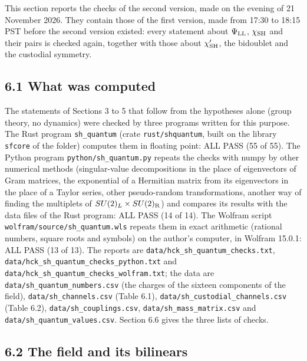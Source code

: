 \documentclass[
  10pt,
]{article}
\begin{document}
This section reports the checks of the second version, made on the
evening of 21 November 2026. They contain those of the first version,
made from 17:30 to 18:15 PST before the second version existed: every
statement about \(\Psi_{\rm LL}\), \(\chi_{\rm SH}\) and their pairs is
checked again, together with those about \(\chi'_{\rm SH}\), the
bidoublet and the custodial symmetry.

\hypertarget{what-was-computed}{%
\subsection{6.1 What was computed}\label{what-was-computed}}

The statements of Sections 3 to 5 that follow from the hypotheses alone
(group theory, no dynamics) were checked by three programs written for
this purpose. The Rust program \texttt{sh\_quantum} (crate
\texttt{rust/shquantum}, built on the library \texttt{sfcore} of the
folder) computes them in floating point: ALL PASS (55 of 55). The Python
program \texttt{python/sh\_quantum.py} repeats the checks with numpy by
other numerical methods (singular-value decompositions in the place of
eigenvectors of Gram matrices, the exponential of a Hermitian matrix
from its eigenvectors in the place of a Taylor series, other
pseudo-random transformations, another way of finding the multiplets of
\(SU(2)_L\times SU(2)_{\rm R}\)) and compares its results with the data
files of the Rust program: ALL PASS (14 of 14). The Wolfram script
\texttt{wolfram/source/sh\_quantum.wls} repeats them in exact arithmetic
(rational numbers, square roots and symbols) on the author's computer,
in Wolfram 15.0.1: ALL PASS (13 of 13). The reports are
\texttt{data/hck\_sh\_quantum\_checks.txt},
\texttt{data/hck\_sh\_quantum\_checks\_python.txt} and
\texttt{data/hck\_sh\_quantum\_checks\_wolfram.txt}; the data are
\texttt{data/sh\_quantum\_numbers.csv} (the charges of the sixteen
components of the field), \texttt{data/sh\_channels.csv} (Table 6.1),
\texttt{data/sh\_custodial\_channels.csv} (Table 6.2),
\texttt{data/sh\_couplings.csv}, \texttt{data/sh\_mass\_matrix.csv} and
\texttt{data/sh\_quantum\_values.csv}. Section 6.6 gives the three lists
of checks.

\hypertarget{the-field-and-its-bilinears}{%
\subsection{6.2 The field and its
bilinears}\label{the-field-and-its-bilinears}}
\end{document}
